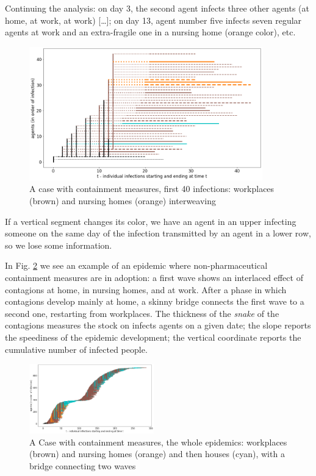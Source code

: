 \documentclass[graybox]{svmult}
\begin{document}
Continuing the analysis: on day 3, the second agent infects three other agents (at home, at work, at work) [\dots]; on day 13, agent number five infects seven regular agents at work and an extra-fragile one in a nursing home (orange color), etc.

\begin{figure}[t]
\center
\includegraphics[width=0.9\textwidth]{with8b40.png}%
\caption{A case with containment measures, first 40 infections: workplaces (brown) and nursing homes (orange) interweaving}
\label{shortExample}
\end{figure}

If a vertical segment changes its color, we have an agent in an upper infecting someone on the same day of the infection transmitted by an agent in a lower row, so we lose some information.

In Fig. \ref{workplacesNursingHomesFull} we see an example of an epidemic where non-pharmaceutical containment measures are in adoption: a first wave shows an interlaced effect of contagions at home, in nursing homes, and at work. After a phase in which contagions develop mainly at home, a skinny bridge connects the first wave to a second one, restarting from workplaces. The thickness of the \emph{snake} of the contagions measures the stock on infects agents on a given date; the slope reports the speediness of the epidemic development; the vertical coordinate reports the cumulative number of infected people.

\begin{figure}[t]
\center
\includegraphics[width=0.48\textwidth]{with8a.png}%
\caption{A Case with containment measures, the whole epidemics: workplaces (brown) and nursing homes (orange) and then houses (cyan), with a bridge connecting two waves}
\label{workplacesNursingHomesFull}
\end{figure}
\end{document}
